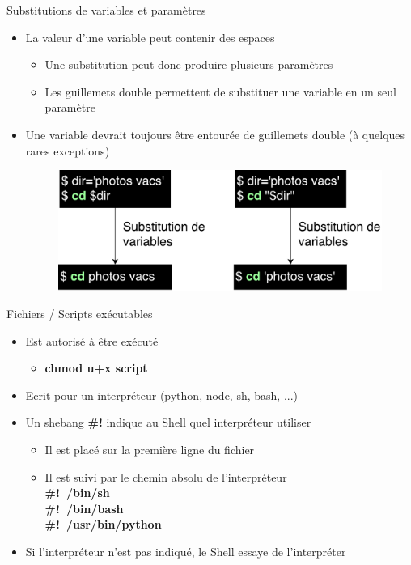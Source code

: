 \documentclass[xcolor=table]{beamer}
\begin{document}
\begin{frame}{Substitutions de variables et paramètres}
\begin{itemize}
    \item La valeur d'une variable peut contenir des espaces
    \begin{itemize}
        \item Une substitution peut donc produire plusieurs paramètres
        \item Les guillemets double permettent de substituer une variable en un seul paramètre
    \end{itemize}
    \item Une variable devrait toujours être entourée de guillemets double (à quelques rares exceptions)
    \begin{figure}
        \includegraphics[scale=0.5]{fig/double-quoted-var.pdf}
    \end{figure}
\end{itemize}
\end{frame}

\begin{frame}{Fichiers / Scripts exécutables}
\begin{itemize}
    \item Est autorisé à être exécuté
    \begin{itemize}
        \item \textbf{chmod u+x script}
    \end{itemize}
    \item Ecrit pour un interpréteur (python, node, sh, bash, ...)
    \item Un shebang \textbf{\#!} indique au Shell quel interpréteur utiliser
    \begin{itemize}
        \item Il est placé sur la première ligne du fichier
        \item Il est suivi par le chemin absolu de l'interpréteur\\
        \textbf{\#!~/bin/sh}\\
        \textbf{\#!~/bin/bash}\\
        \textbf{\#!~/usr/bin/python}
    \end{itemize}
    \item Si l'interpréteur n'est pas indiqué, le Shell essaye de l'interpréter
\end{itemize}
\end{frame}
\end{document}
